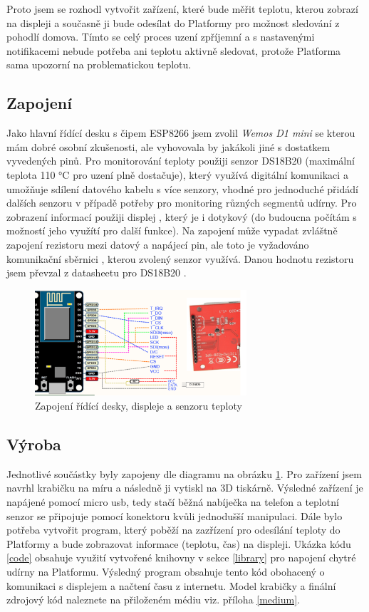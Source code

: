 Proto jsem se rozhodl vytvořit zařízení, které bude měřit teplotu, kterou zobrazí na displeji a současně ji bude odesílat do Platformy pro možnost sledování z pohodlí domova. Tímto se celý proces uzení zpříjemní a s nastavenými notifikacemi nebude potřeba ani teplotu aktivně sledovat, protože Platforma sama upozorní na problematickou teplotu.

\subsection{Zapojení} %
Jako hlavní řídící desku s čipem ESP8266 jsem zvolil \textit{Wemos D1 mini} se kterou mám dobré osobní zkušenosti, ale vyhovovala by jakákoli jiné s dostatkem vyvedených pinů. Pro monitorování teploty použiji senzor DS18B20 (maximální teplota 110 °C pro uzení plně dostačuje), který využívá digitální komunikaci a umožňuje sdílení datového kabelu s více senzory, vhodné pro jednoduché přidádí dalších senzoru v případě potřeby pro monitoring různých segmentů udírny. Pro zobrazení informací použiji displej , který je i dotykový (do budoucna počítám s možností jeho využítí pro další funkce). Na zapojení může vypadat zvláštně zapojení rezistoru mezi datový a napájecí pin, ale toto je vyžadováno komunikační sběrnici  \cite{1-wire}, kterou zvolený senzor využívá. Danou hodnotu rezistoru jsem převzal z datasheetu pro DS18B20 \cite{1-wire-ds}.

\begin{figure}[htbp]
    \centering
    \includegraphics[width=0.7\textwidth]{img/wiring.pdf}
    \caption{\label{img-wiring}Zapojení řídící desky, displeje a senzoru teploty \cite{esp-wiring}}
\end{figure}

\subsection{Výroba} %
Jednotlivé součástky byly zapojeny dle diagramu na obrázku \ref{img-wiring}. Pro zařízení jsem navrhl krabičku na míru a následně ji vytiskl na 3D tiskárně. Výsledné zařízení je napájené pomocí micro usb, tedy stačí běžná nabíječka na telefon a teplotní senzor se připojuje pomocí konektoru kvůli jednodušší manipulaci. Dále bylo potřeba vytvořit program, který poběží na zazřízení pro odesílání teploty do Platformy a bude zobrazovat informace (teplotu, čas) na displeji. Ukázka kódu \ref{code} obsahuje využití vytvořené knihovny v sekce \ref{library} pro napojení chytré udírny na Platformu. Výsledný program obsahuje tento kód obohacený o komunikaci s displejem a načtení času z internetu. Model krabičky a finální zdrojový kód naleznete na přiloženém médiu viz. příloha \ref{medium}.

